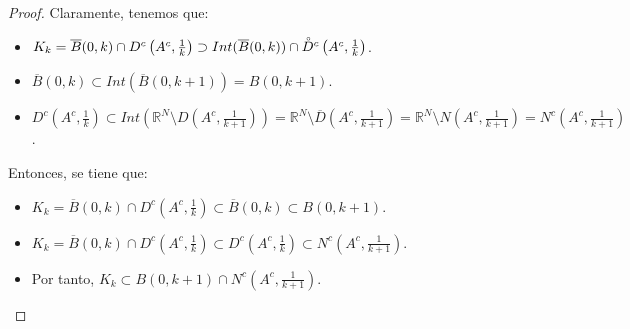 \documentclass[a4paper, 11pt]{article} %
\begin{document}
\begin{enumerate}
\begin{enumerate}[label=\alph*)]
\begin{proof}
			Claramente, tenemos que:
			\begin{itemize}
				\item $K_k = \overline{B}(0,k) \cap D^c\left(A^c,\frac{1}{k}\right) \supset Int(\overline{B}(0,k)) \cap \accentset{\circ}D^c\left(A^c,\frac{1}{k}\right)$.
				\item $\overline{B}(0,k) \subset Int(\overline{B}(0,k+1))=B(0,k+1)$.
				\item $D^c(A^c,\frac{1}{k}) \subset Int\left(\mathbb{R}^N \setminus D\left(A^c,\frac{1}{k+1}\right)\right) = \mathbb{R}^N \setminus \overline{D}\left(A^c,\frac{1}{k+1}\right) = \mathbb{R}^N \setminus N\left(A^c,\frac{1}{k+1}\right) = N^c\left(A^c,\frac{1}{k+1}\right)$.
			\end{itemize}
			
			Entonces, se tiene que:
			\begin{itemize}
				\item $K_k = \overline{B}(0,k) \cap D^c\left(A^c,\frac{1}{k}\right) \subset \overline{B}(0,k) \subset B(0,k+1)$.
				\item $K_k = \overline{B}(0,k) \cap D^c\left(A^c,\frac{1}{k}\right) \subset D^c\left(A^c,\frac{1}{k}\right) \subset N^c\left(A^c,\frac{1}{k+1}\right)$.
				\item Por tanto, $K_k \subset B(0,k+1) \cap N^c\left(A^c,\frac{1}{k+1}\right)$.
			\end{itemize}
			

\end{proof}
\end{enumerate}
\end{enumerate}
\end{document}
